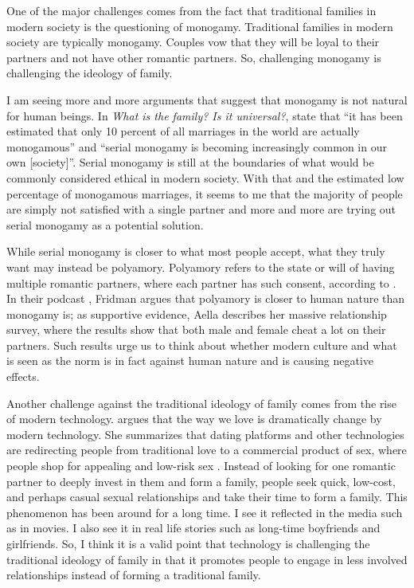 \documentclass[12pt]{article}
\begin{document}
One of the major challenges comes from the fact that traditional families
in modern society is the questioning of monogamy.
Traditional families in modern society are typically monogamy.
Couples vow that they will be loyal to their partners and not have other
romantic partners.
So, challenging monogamy is challenging the ideology of family.

I am seeing more and more arguments that suggest that monogamy is not natural
for human beings.
In \textit{What is the family? Is it universal?},
\citet[p. 63]{gittins1993family} state that
``it has been estimated that only 10 percent of all
marriages in the world are actually monogamous'' and
``serial monogamy is becoming increasingly common in our own [society]''.
Serial monogamy is still at the boundaries of what would be commonly considered
ethical in modern society.
With that and the estimated low percentage of monogamous marriages,
it seems to me that the majority of people are simply not satisfied with a
single partner and
more and more are trying out serial monogamy as a potential solution.

While serial monogamy is closer to what most people accept,
what they truly want may instead be polyamory.
Polyamory refers to the state or will of having multiple romantic partners,
where each partner has such consent, according to \cite{wikipedia2023polyamory}.
In their podcast \citep{fridman2023aella},
Fridman argues that polyamory is closer to human nature than monogamy is;
as supportive evidence, Aella describes her massive relationship survey,
where the results show that both male and female cheat a lot on their partners.
Such results urge us to think about whether modern culture and what is seen as
the norm is in fact against human nature and is causing negative effects.

Another challenge against the traditional ideology of family comes from the rise
of modern technology. \citet{malinowska2022love} argues that the way we love is
dramatically change by modern technology.
She summarizes that dating platforms and other technologies are redirecting
people from traditional love to a commercial product of sex,
where people shop for appealing and low-risk sex \citep{malinowska2022love}.
Instead of looking for one romantic partner to deeply invest in them and form a
family, people seek quick, low-cost, and perhaps casual sexual relationships and
take their time to form a family.
This phenomenon has been around for a long time.
I see it reflected in the media such as in movies.
I also see it in real life stories such as long-time boyfriends and girlfriends.
So, I think it is a valid point that technology is challenging the traditional
ideology of family in that it promotes people to engage in less involved
relationships instead of forming a traditional family.

\citep{schwitzgebel2008thoughts}

\pagebreak


\end{document}
